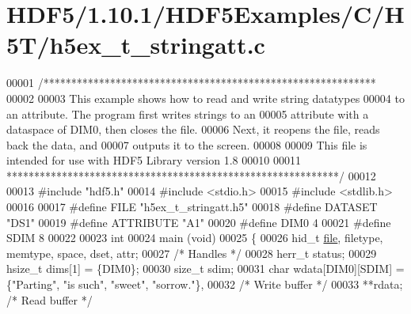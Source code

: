 \hypertarget{_h_d_f5_21_810_81_2_h_d_f5_examples_2_c_2_h5_t_2h5ex__t__stringatt_8c_source}{}\section{H\+D\+F5/1.10.1/\+H\+D\+F5\+Examples/\+C/\+H5\+T/h5ex\+\_\+t\+\_\+stringatt.c}
\label{_h_d_f5_21_810_81_2_h_d_f5_examples_2_c_2_h5_t_2h5ex__t__stringatt_8c_source}

\begin{DoxyCode}
00001 \textcolor{comment}{/************************************************************}
00002 \textcolor{comment}{}
00003 \textcolor{comment}{  This example shows how to read and write string datatypes}
00004 \textcolor{comment}{  to an attribute.  The program first writes strings to an}
00005 \textcolor{comment}{  attribute with a dataspace of DIM0, then closes the file.}
00006 \textcolor{comment}{  Next, it reopens the file, reads back the data, and}
00007 \textcolor{comment}{  outputs it to the screen.}
00008 \textcolor{comment}{}
00009 \textcolor{comment}{  This file is intended for use with HDF5 Library version 1.8}
00010 \textcolor{comment}{}
00011 \textcolor{comment}{ ************************************************************/}
00012 
00013 \textcolor{preprocessor}{#include "hdf5.h"}
00014 \textcolor{preprocessor}{#include <stdio.h>}
00015 \textcolor{preprocessor}{#include <stdlib.h>}
00016 
00017 \textcolor{preprocessor}{#define FILE            "h5ex\_t\_stringatt.h5"}
00018 \textcolor{preprocessor}{#define DATASET         "DS1"}
00019 \textcolor{preprocessor}{#define ATTRIBUTE       "A1"}
00020 \textcolor{preprocessor}{#define DIM0            4}
00021 \textcolor{preprocessor}{#define SDIM            8}
00022 
00023 \textcolor{keywordtype}{int}
00024 main (\textcolor{keywordtype}{void})
00025 \{
00026     hid\_t       \hyperlink{structfile}{file}, filetype, memtype, space, dset, attr;
00027                                             \textcolor{comment}{/* Handles */}
00028     herr\_t      status;
00029     hsize\_t     dims[1] = \{DIM0\};
00030     \textcolor{keywordtype}{size\_t}      sdim;
00031     \textcolor{keywordtype}{char}        wdata[DIM0][SDIM] = \{\textcolor{stringliteral}{"Parting"}, \textcolor{stringliteral}{"is such"}, \textcolor{stringliteral}{"sweet"}, \textcolor{stringliteral}{"sorrow."}\},
00032                                             \textcolor{comment}{/* Write buffer */}
00033                 **rdata;                    \textcolor{comment}{/* Read buffer */}

\end{DoxyCode}
